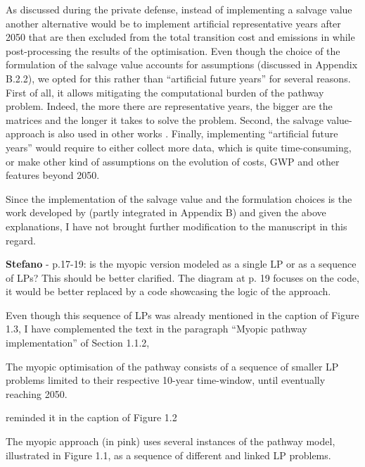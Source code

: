 \documentclass[12pt,a4paper]{article}
\begin{document}
As discussed during the private defense, instead of implementing a salvage value another alternative would be to implement artificial representative years after 2050 that are then excluded from the total transition cost and emissions in while post-processing the results of the optimisation. Even though the choice of the formulation of the salvage value accounts for assumptions (discussed in Appendix B.2.2), we opted for this rather than ``artificial future years'' for several reasons. First of all, it allows mitigating the computational burden of the pathway problem. Indeed, the more there are representative years, the bigger are the matrices and the longer it takes to solve the problem. Second, the salvage value-approach is also used in other works \cite{poncelet2016myopic,prina2019transition}. Finally, implementing ``artificial  future years'' would require to either collect more data, which is quite time-consuming, or make other kind of assumptions on the evolution of costs, GWP and other features beyond 2050.

Since the implementation of the salvage value and the formulation choices is the work developed by \citet{limpens2024pathway} (partly integrated in Appendix B) and given the above explanations, I have not brought further modification to the manuscript in this regard.

\begin{mdframed}[style=comment] %
{\color{orange} \textbf{Stefano}} - p.17-19: is the myopic version modeled as a single LP or as a sequence of LPs? This should be better clarified. The diagram at p. 19 focuses on the code, it would be better replaced by a code showcasing the logic of the approach.
\end{mdframed}

\noindent Even though this sequence of LPs was already mentioned {\color{blue}in the caption of Figure 1.3}, I have complemented the text {\color{blue} in the paragraph ``Myopic pathway implementation'' of Section 1.1.2}, 

\begin{mdframed}[style=manuscript] %
[...] The myopic optimisation of the pathway consists of a sequence of smaller LP problems limited to their respective 10-year time-window, until eventually reaching 2050.
\end{mdframed}

\noindent reminded it in the caption of Figure 1.2

\begin{mdframed}[style=manuscript] %
The myopic approach (in pink) uses several instances of the pathway model, illustrated in Figure 1.1, as a sequence of different and linked LP problems. 
\end{mdframed}
\end{document}
